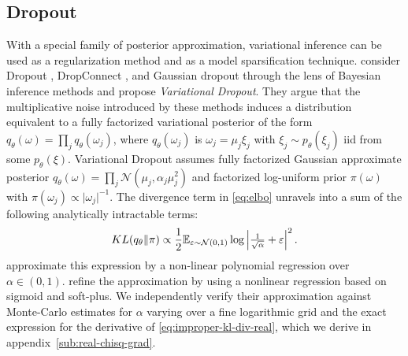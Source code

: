 \documentclass[a4paper,10pt]{article}
\begin{document}
\subsection{Dropout} %
\label{sub:dropout}

With a special family of posterior approximation, variational inference can be used as
a regularization method and as a model sparsification technique. \citet{kingma_variational_2015}
consider Dropout \citep{hinton_improving_2012}, DropConnect \citep{wan_regularization_2013},
and Gaussian dropout \citep{srivastava_dropout_2014,wang_fast_2013} through the lens
of Bayesian inference methods and propose \textit{Variational Dropout}. They argue that
the multiplicative noise introduced by these methods induces a distribution equivalent to
a fully factorized variational posterior of the form $
  q_\theta(\omega) = \prod_j q_{\theta}(\omega_j)
$, where $q_{\theta}(\omega_j)$ is $\omega_j = \mu_j \xi_j$ with $
  \xi_j \sim p_\theta(\xi_j)
$ iid from some $p_\theta(\xi)$.
%
%
Variational Dropout assumes fully factorized Gaussian approximate posterior $
  q_\theta(\omega)
    = \prod_j \mathcal{N}(\mu_j, \alpha_j \mu_j^2)
$ and factorized log-uniform prior $\pi(\omega)$ with $
  \pi(\omega_j) \propto \lvert \omega_j \rvert^{-1}
$. The divergence term in \eqref{eq:elbo} unravels into a sum of the following
analytically intractable terms:
\begin{equation}  \label{eq:improper-kl-div-real}
  KL(q_\theta \| \pi)
    \propto
      \frac12 \mathbb{E}_{\varepsilon \sim \mathcal{N}(0, 1)}
        \log{\Bigl\lvert \tfrac1{\sqrt{\alpha}} + \varepsilon \Bigr\rvert^2}
  \,.
\end{equation}
\citet{kingma_variational_2015} approximate this expression by a non-linear polynomial
regression over $\alpha \in (0, 1)$. \citet{molchanov_variational_2017} refine the
approximation by using a nonlinear regression based on sigmoid and soft-plus.
We independently verify their approximation against Monte-Carlo estimates for $\alpha$
varying over a fine logarithmic grid and the exact expression for the derivative of
\eqref{eq:improper-kl-div-real}, which we derive in appendix~\ref{sub:real-chisq-grad}.
%
\end{document}
